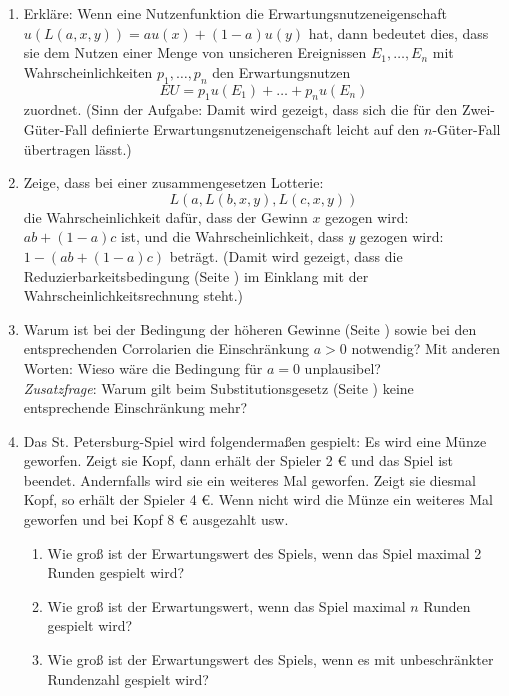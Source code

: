 \begin{enumerate}
\item Erkläre: Wenn eine Nutzenfunktion die Erwartungsnutzeneigenschaft 
$u(L(a,x,y)) = au(x) + (1-a)u(y)$ hat, dann bedeutet dies, dass sie dem
Nutzen einer Menge von unsicheren Ereignissen $E_1,\ldots , E_n$ mit
Wahrscheinlichkeiten $p_1,\ldots, p_n$ den Erwartungsnutzen
\[ EU = p_1u(E_1) + \ldots + p_nu(E_n) \]
zuordnet. (Sinn der Aufgabe: Damit wird gezeigt, dass sich die für den
Zwei-Güter-Fall definierte Erwartungsnutzeneigenschaft leicht auf den
$n$-Güter-Fall übertragen lässt.)

\item Zeige, dass bei einer zusammengesetzen Lotterie: \[L(a, L(b,x,y),
L(c,x,y))\] die Wahrscheinlichkeit dafür, dass der Gewinn $x$ gezogen wird:
$ab + (1-a)c$ ist, und die Wahrscheinlichkeit, dass $y$ gezogen wird:
$1 - (ab + (1-a)c)$ beträgt. (Damit wird gezeigt, dass die
Reduzierbarkeitsbedingung (Seite \pageref{Reduzierbarkeit}) im Einklang mit der
Wahrscheinlichkeitsrechnung steht.)


\item Warum ist bei der Bedingung der höheren Gewinne (Seite
\pageref{BedHoehereGewinne}) sowie bei den entsprechenden Corrolarien die
Einschränkung $a > 0$ notwendig? Mit anderen Worten: Wieso wäre die Bedingung
für $a = 0$ unplausibel?\\
{\em Zusatzfrage}: Warum gilt beim Substitutionsgesetz (Seite
\pageref{Substitutionsgesetz}) keine entsprechende Einschränkung mehr?

\item Das St. Petersburg-Spiel wird
folgendermaßen gespielt: Es wird eine Münze geworfen. Zeigt sie Kopf, dann erhält der Spieler 2 € und das Spiel ist beendet.
Andernfalls wird sie ein weiteres Mal geworfen. Zeigt sie diesmal Kopf, so erhält der
Spieler 4 €. Wenn nicht wird die Münze ein weiteres Mal geworfen und bei Kopf 8
€ ausgezahlt usw. 
\begin{enumerate}
  \item Wie groß ist der Erwartungswert des Spiels, wenn das Spiel maximal 2
  Runden gespielt wird?
  \item Wie groß ist der Erwartungswert, wenn das Spiel maximal $n$ Runden
  gespielt wird?
  \item Wie groß ist der Erwartungswert des Spiels, wenn es mit un\-beschränkter
  Rundenzahl gespielt wird?
\end{enumerate}
\cite[S. 88]{resnik:1987}


\end{enumerate}

